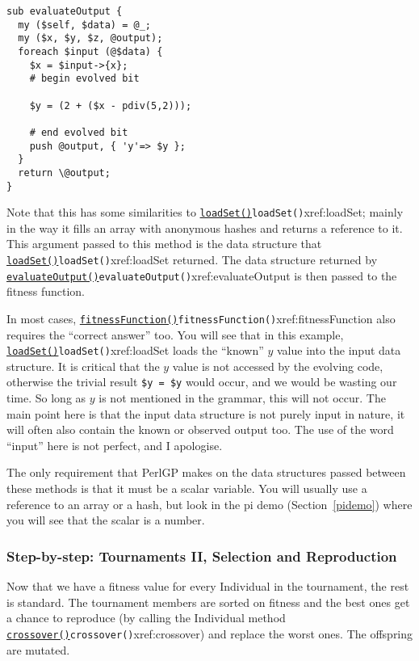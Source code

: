 \documentclass[a4paper]{article}
\begin{document}
\begin{verbatim}
sub evaluateOutput {
  my ($self, $data) = @_;
  my ($x, $y, $z, @output);
  foreach $input (@$data) {
    $x = $input->{x};
    # begin evolved bit

    $y = (2 + ($x - pdiv(5,2)));

    # end evolved bit
    push @output, { 'y'=> $y };
  }
  return \@output;
}
\end{verbatim} %

Note that this has some similarities to \hyperref[no]{\texttt{loadSet()}}{\texttt{loadSet()}}{xref:loadSet}; mainly in
the way it fills an array with anonymous hashes and returns a
reference to it.  This argument passed to this method is the data
structure that \hyperref[no]{\texttt{loadSet()}}{\texttt{loadSet()}}{xref:loadSet} returned.  The data structure
returned by \hyperref[no]{\texttt{evaluateOutput()}}{\texttt{evaluateOutput()}}{xref:evaluateOutput} is then passed to the fitness
function.

In most cases, \hyperref[no]{\texttt{fitnessFunction()}}{\texttt{fitnessFunction()}}{xref:fitnessFunction} also requires the ``correct
answer'' too.  You will see that in this example, \hyperref[no]{\texttt{loadSet()}}{\texttt{loadSet()}}{xref:loadSet}
loads the ``known'' $y$ value into the input data structure.  It is
critical that the $y$ value is not accessed by the evolving code,
otherwise the trivial result \verb:$y = $y: would occur, and we would
be wasting our time.  So long as $y$ is not mentioned in the grammar,
this will not occur.  The main point here is that the input data
structure is not purely input in nature, it will often also contain
the known or observed output too.  The use of the word ``input'' here
is not perfect, and I apologise.

The only requirement that PerlGP makes on the data structures passed
between these methods is that it must be a scalar variable.  You will
usually use a reference to an array or a hash, but look in the pi demo
(Section~\ref{pidemo}) where you will see that the scalar is a number.

\subsubsection{Step-by-step: Tournaments II, Selection and Reproduction}

Now that we have a fitness value for every Individual in the
tournament, the rest is standard.  The tournament members are sorted
on fitness and the best ones get a chance to reproduce (by calling the
Individual method \hyperref[no]{\texttt{crossover()}}{\texttt{crossover()}}{xref:crossover}) and replace the worst ones.
The offspring are mutated.
\end{document}
